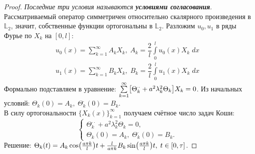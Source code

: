\begin{proof}
\textit{Последние три условия называются \textbf{условиями согласования}}. \\
Рассматриваемый оператор симметричен относительно скалярного произведения в $\mathbb{L}_2$, значит, собственные функции ортогональны в $\mathbb{L}_2$. Разложим $u_0, u_1$ в ряды Фурье по $X_k$ на $[0, l]$:
\begin{align*}
	u_0(x) = \sum\limits_{k = 1}^{\infty} A_kX_k,\; A_k = \dfrac{2}{l} \int\limits_{0}^l u_0(x)X_k\;dx \\
	u_1(x) = \sum\limits_{k = 1}^{\infty} B_kX_k,\; B_k = \dfrac{2}{l} \int\limits_{0}^l u_1(x)X_k\;dx 
\end{align*}
Формально подставляем в уравнение: $\sum\limits_{k = 1}^{\infty}\bigl[\Theta^{\cdotp \cdotp}_k + a^2 \lambda_k^2\Theta_k\bigr]X_k = 0$. Из начальных условий: $\Theta_k(0) = A_k,\; \Theta^{\cdotp}_k(0) = B_k$. \\
В силу ортогональности $\{X_k(x)\}_{k = 1}^{\infty}$ получаем счётное число задач Коши:
\begin{equation*}
\begin{cases}
	\Theta^{\cdotp \cdotp}_k + a^2 \lambda_k^2\Theta_k = 0, \\
	\Theta_k(0) = A_k,\; \Theta^{\cdotp}_k(0) = B_k.
\end{cases}
\end{equation*}
Решение: $\Theta_k(t) = A_k\cos \bigl(\frac{a \pi k}{l}\bigr)t + \frac{l}{a \pi k}B_k \sin \bigl(\frac{a \pi k}{l}\bigr)t,\; t \in [0, \tau]$. 
\end{proof}
